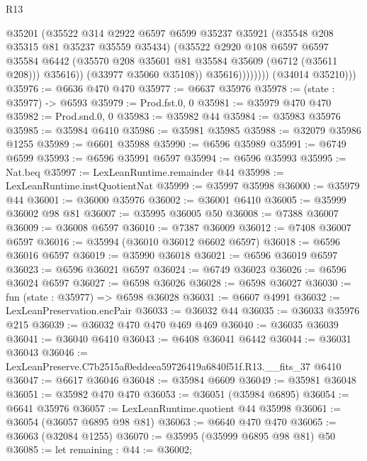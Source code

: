 \begin{lexlean}{R13}
\begin{coremodule}
                          @35201
                          (@35522
                            @314
                            @2922
                            @6597
                            @6599
                            @35237
                            @35921
                            (@35548 @208 @35315 @81 @35237 @35559 @35434)
                            (@35522
                              @2920
                              @108
                              @6597
                              @6597
                              @35584
                              @6442
                              (@35570 @208 @35601 @81 @35584 @35609 (@6712 (@35611 @208)))
                              @35616))
                          (@33977 @35060 @35108))
                        @35616))))))))
        (@34014 @35210)))
@35976 := @6636 @470 @470
@35977 := @6637 @35976
@35978 := (state : @35977) -> @6593
@35979 := Prod.fst.{0, 0}
@35981 := @35979 @470 @470
@35982 := Prod.snd.{0, 0}
@35983 := @35982 @44
@35984 := @35983 @35976
@35985 := @35984 @6410
@35986 := @35981 @35985
@35988 := @32079 @35986 @1255
@35989 := @6601 @35988
@35990 := @6596 @35989
@35991 := @6749 @6599
@35993 := @6596 @35991 @6597
@35994 := @6596 @35993
@35995 := Nat.beq
@35997 := LexLeanRuntime.remainder @44
@35998 := LexLeanRuntime.instQuotientNat
@35999 := @35997 @35998
@36000 := @35979 @44
@36001 := @36000 @35976
@36002 := @36001 @6410
@36005 := @35999 @36002 @98 @81
@36007 := @35995 @36005 @50
@36008 := @7388 @36007
@36009 := @36008 @6597
@36010 := @7387 @36009
@36012 := @7408 @36007 @6597
@36016 := @35994 (@36010 @36012 @6602 @6597)
@36018 := @6596 @36016 @6597
@36019 := @35990 @36018
@36021 := @6596 @36019 @6597
@36023 := @6596 @36021 @6597
@36024 := @6749 @36023
@36026 := @6596 @36024 @6597
@36027 := @6598 @36026
@36028 := @6598 @36027
@36030 := fun (state : @35977) => @6598 @36028
@36031 := @6607 @4991
@36032 := LexLeanPreservation.encPair
@36033 := @36032 @44
@36035 := @36033 @35976 @215
@36039 := @36032 @470 @470 @469 @469
@36040 := @36035 @36039
@36041 := @36040 @6410
@36043 := @6408 @36041 @6442
@36044 := @36031 @36043
@36046 := LexLeanPreserve.C7b2515af0eddeea59726419a6840f51f.R13.__fits_37 @6410
@36047 := @6617 @36046
@36048 := @35984 @6609
@36049 := @35981 @36048
@36051 := @35982 @470 @470
@36053 := @36051 (@35984 @6895)
@36054 := @6641 @35976
@36057 := LexLeanRuntime.quotient @44 @35998
@36061 := @36054 (@36057 @6895 @98 @81)
@36063 := @6640 @470 @470
@36065 := @36063 (@32084 @1255)
@36070 := @35995 (@35999 @6895 @98 @81) @50
@36085 := let remaining : @44 := @36002;

\end{coremodule}
\end{lexlean}
